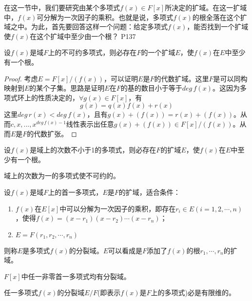 \original
{
	在这一节中，我们要研究由某个多项式$f(x)\in F[x]$所决定的扩域。在这一扩域中，$f(x)$可分解为一次因子的乘积。也就是说，多项式$f(x)$的根全落在这个扩域之中。为此，首先要回答这样一个问题：给定多项式$f(x)$，能否找到一个扩域使$f(x)$在这个扩域中至少由一个根？
}
{P137}

\begin{lemma}
	设$f(x)$是域$F$上的不可约多项式，则必存在$F$的一个扩域$E$，使$f(x)$在$E$中至少有一个根。
\end{lemma}

\begin{proof}
	考虑$E=F[x]/(f(x))$，可以证明$E$是$F$的代数扩域。这里$F$是可以同构映射到$E$的某个子集。思路是证明$E$在$F$的基的数目小于等于$deg\, f(x)$。这因为多项式环上的性质决定的，$\forall g(x)\in F[x]$，有
	\begin{equation*}
		g(x)=q(x)f(x)+r(x)
	\end{equation*}
	这里$deg\,r(x)< deg\,f(x) $，且有$g(x)+(f(x))=r(x)+(f(x))$。从而$c,x,...,x^{deg\,f(x)-1}$线性表示出任意$g(x)+(f(x))\in  F[x]/(f(x))$。从而$E$是$F$的代数扩张。
\end{proof}

\begin{corollary}[Kronecker定理]
	设$f(x)$是域上的次数不小于1的多项式，则必存在$F$的扩域$E$，使$f(x)$在$E$中至少有一个根。
\end{corollary}
\begin{hint}
	域上的次数为一的多项式使不可约的。
\end{hint}


\begin{definition}
	设$f(x)$是域$F$上的首一多项式，$E$是$F$的扩域，适合条件：
	\begin{enumerate}
		\item $f(x)$在$E[x]$中可以分解为一次因子的乘积，即存在$r_{i}\in E(i=1,2,\cdots,n)$，使得$f(x)=(x-r_{1})(x-r_{2})\cdots(x-r_{n})$；
		\item $E=F(r_{1},r_{2},\cdots,r_{n})$
	\end{enumerate}
	则称$E$是多项式$f(x)$的分裂域。$E$可以看成是$F$添加了$f(x)$的根$r_{1},\cdots,r_{n}$的扩域。
\end{definition}

\begin{theorem}\label{YMSthe040401}
	$F[x]$中任一非零首一多项式均有分裂域。
\end{theorem}

\begin{proposition}
	任一多项式$f(x)$的分裂域$E/F$(即表示$f(x)$是$F$上的多项式)必是有限维的。
\end{proposition}

